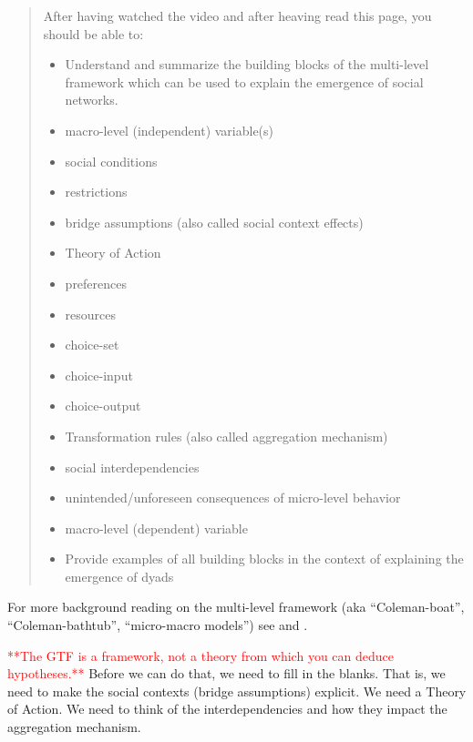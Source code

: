 \documentclass[
]{book}
\providecommand{\tightlist}{%
  \setlength{\itemsep}{0pt}\setlength{\parskip}{0pt}}
\begin{document}
\begin{quote}
After having watched the video and after heaving read this page, you should be able to:

\begin{itemize}
\tightlist
\item
  Understand and summarize the building blocks of the multi-level framework which can be used to explain the emergence of social networks.\\
\item
  macro-level (independent) variable(s)\\
\item
  social conditions\\
\item
  restrictions\\
\item
  bridge assumptions (also called social context effects)\\
\item
  Theory of Action\\
\item
  preferences\\
\item
  resources\\
\item
  choice-set\\
\item
  choice-input\\
\item
  choice-output\\
\item
  Transformation rules (also called aggregation mechanism)\\
\item
  social interdependencies\\
\item
  unintended/unforeseen consequences of micro-level behavior\\
\item
  macro-level (dependent) variable
\item
  Provide examples of all building blocks in the context of explaining the emergence of dyads
\end{itemize}
\end{quote}

For more background reading on the multi-level framework (aka ``Coleman-boat'', ``Coleman-bathtub'', ``micro-macro models'') see \citep{coleman1994} and \citep[especially paragraph 4.4]{raub2011}.

\textcolor{red}{**The GTF is a framework, not a theory from which you can deduce hypotheses.**} Before we can do that, we need to fill in the blanks. That is, we need to make the social contexts (bridge assumptions) explicit. We need a Theory of Action. We need to think of the interdependencies and how they impact the aggregation mechanism.
\end{document}
